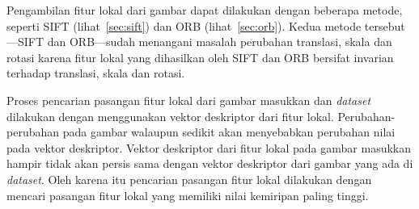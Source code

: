 Pengambilan fitur lokal dari gambar dapat dilakukan dengan beberapa metode, seperti SIFT (lihat~\ref{sec:sift}) dan ORB (lihat~\ref{sec:orb}). Kedua metode tersebut---SIFT dan ORB---sudah menangani masalah perubahan translasi, skala dan rotasi karena fitur lokal yang dihasilkan oleh SIFT dan ORB bersifat invarian terhadap translasi, skala dan rotasi.

Proses pencarian pasangan fitur lokal dari gambar masukkan dan \textit{dataset} dilakukan dengan menggunakan vektor deskriptor dari fitur lokal. Perubahan-perubahan pada gambar walaupun sedikit akan menyebabkan perubahan nilai pada vektor deskriptor. Vektor deskriptor dari fitur lokal pada gambar masukkan hampir tidak akan persis sama dengan vektor deskriptor dari gambar yang ada di \textit{dataset}. Oleh karena itu pencarian pasangan fitur lokal dilakukan dengan mencari pasangan fitur lokal yang memiliki nilai kemiripan paling tinggi.

